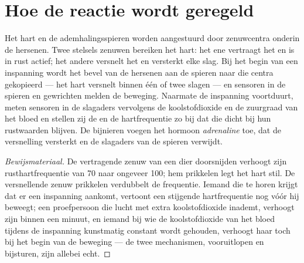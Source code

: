 \section{Hoe de reactie wordt geregeld}

\begin{proposition}\label{prop:g10:heart-lungs-effort:control}
Het hart en de ademhalingsspieren worden aangestuurd door zenuwcentra
onderin de hersenen. Twee stelsels zenuwen bereiken het hart: het ene
vertraagt het en is in rust actief; het andere versnelt het en versterkt
elke slag. Bij het begin van een inspanning wordt het bevel van de
hersenen aan de spieren naar die centra gekopieerd --- het hart versnelt
binnen één of twee slagen --- en sensoren in de spieren en gewrichten
melden de beweging. Naarmate de inspanning voortduurt, meten sensoren in
de slagaders vervolgens de koolstofdioxide en de zuurgraad van het bloed
en stellen zij de  en de hartfrequentie zo bij dat die dicht
bij hun rustwaarden blijven. De bijnieren voegen het hormoon
\emph{adrenaline} toe, dat de versnelling versterkt en
de slagaders van de spieren verwijdt.
\end{proposition}
\begin{proof}[Bewijsmateriaal]
De vertragende zenuw van een dier doorsnijden verhoogt zijn
rusthartfrequentie van 70 naar ongeveer 100; hem prikkelen legt het hart
stil. De versnellende zenuw prikkelen verdubbelt de frequentie. Iemand
die te horen krijgt dat er een inspanning aankomt, vertoont een stijgende
hartfrequentie nog vóór hij beweegt; een proefpersoon die lucht met extra
koolstofdioxide inademt, verhoogt zijn  binnen een minuut, en
iemand bij wie de koolstofdioxide van het bloed tijdens de inspanning
kunstmatig constant wordt gehouden, verhoogt haar toch bij het begin van
de beweging --- de twee mechanismen, vooruitlopen en bijsturen, zijn
allebei echt.
\end{proof}

